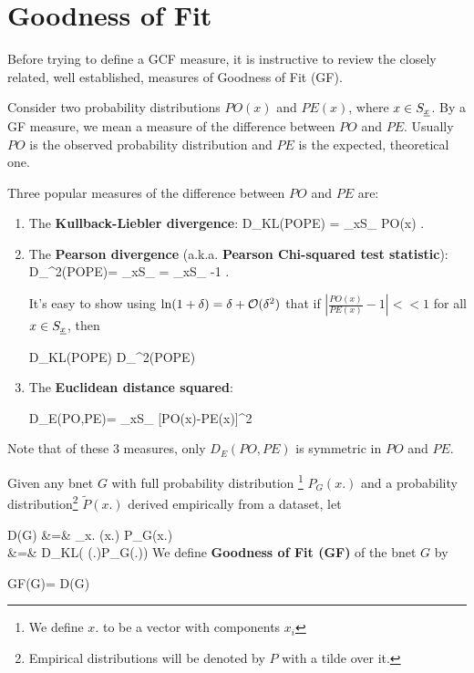 \documentclass[12pt]{article}
\begin{document}
\section{Goodness of Fit}
Before trying to
define a GCF measure,
it
is instructive to review 
the closely related, well established, measures
of Goodness of Fit (GF). 



Consider 
two
probability distributions
$PO(x)$ and $PE(x)$,
where $x\in S_{\underline{x}}$.
By a GF measure, we mean 
a measure of the 
difference between 
$PO$ and $PE$.
Usually $PO$ is the
observed probability distribution and 
$PE$ is the expected, theoretical one.


Three popular
measures of
the difference between $PO$ and $PE$
are:
\begin{enumerate}
\item
The
{\bf Kullback-Liebler divergence}:
\beq
D_{KL}(PO\parallel PE) =
\sum_{x\in S_\rvx}
PO(x)\ln {}
\;.
\eeq
\item
The
{\bf Pearson divergence}
(a.k.a. {\bf Pearson Chi-squared test statistic}):
\beq
D_{\chi^2}(PO\parallel PE)=
\sum_{x\in S_\rvx}
=
\sum_{x\in S_\rvx}
-1
\;.
\eeq

It's easy to show 
using $\ln(1+\delta)=\delta +{\cal O}(\delta^2)$
that
if $\left|\frac{PO(x)}{PE(x)}-1\right|<<1$
for all $x\in S_{\underline{x}}$, then

\beq
D_{KL}(PO\parallel PE)\approx 
D_{\chi^2}(PO\parallel PE)
\eeq

\item
The {\bf Euclidean distance squared}:

\beq
D_E(PO,PE)=
\sum_{x\in S_\rvx}
[PO(x)-PE(x)]^2
\eeq
\end{enumerate}
Note that of these 3 measures,
only $D_E(PO, PE)$ is symmetric 
in $PO$ and $PE$.


Given any bnet $G$
with full probability
distribution
\footnote{We define
$x.$
to be a vector
with components $x_i$}
  $P_G(x.)$
and a
probability distribution\footnote{
Empirical distributions will 
be denoted by $P$ with a tilde over it.}
$\tilde{P}(x.)$
derived empirically from a dataset,
let

\beqa
D(G)
&=&
\sum_{x.}
(x.)\ln 
{}
{P_{G}(x.)}
\\
&=&
D_{KL}(
(\rvx.)\parallel P_{G}(\rvx.))
\eeqa
We define {\bf Goodness of Fit (GF)}
of the bnet $G$ by

\beq
GF(G)=\ln {}
{D(G)}
\eeq
\end{document}
